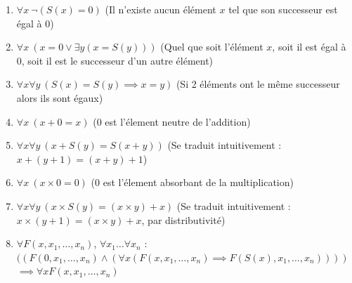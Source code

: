 \begin{enumerate}
    \item $\forall x \ \neg(S(x)=0)$ \newline
    (Il n'existe aucun élément $x$ tel que son successeur est égal à $0$)
    
    \item $\forall x \ (x=0 \vee \exists y (x=S(y)))$ \newline
    (Quel que soit l'élément $x$, soit il est égal à $0$, soit il est le successeur d'un autre élément)
    
    \item $\forall x \forall y \ (S(x)=S(y) \implies x=y)$ \newline
    (Si 2 éléments ont le même successeur alors ils sont égaux)
    
    \item $\forall x \ (x+0=x)$ \newline
    ($0$ est l'élement neutre de l'addition)
    
    \item $\forall x \forall y \ (x+S(y) = S(x+y))$ \newline
    (Se traduit intuitivement : $x + (y + 1) = (x + y) + 1$)
    
    \item $\forall x \ (x \times 0 = 0)$ \newline
    ($0$ est l'élement absorbant de la multiplication)
    
    \item $\forall x \forall y \ (x \times S(y) = (x \times y) + x)$ \newline
    (Se traduit intuitivement : $x \times (y+1) = (x\times y) + x$, par distributivité)
    
    \item $\forall F(x, x_1, \ldots , x_n)$, $\forall x_1 \ldots \forall x_n$  : \newline
    $((F(0,x_1,\ldots,x_n) \wedge (\forall x (F(x,x_1,\ldots,x_n) \implies F(S(x),x_1,\ldots,x_n)))) $ \newline 
    $\implies \forall x F(x,x_1,\ldots,x_n)$
\end{enumerate}

